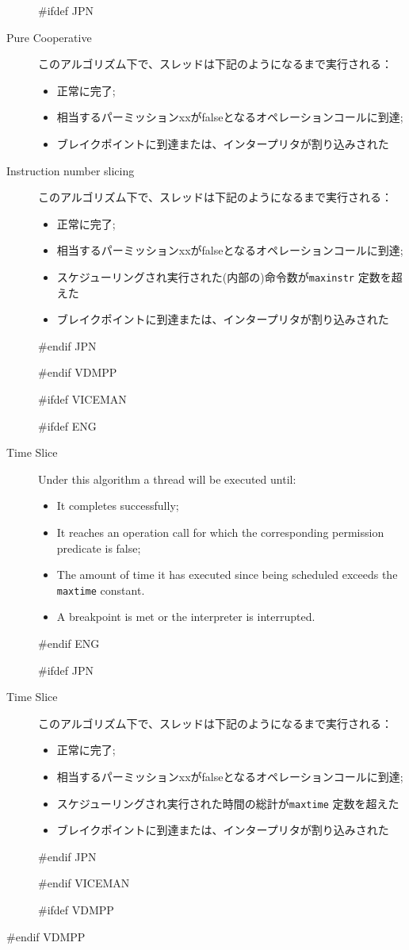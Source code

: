 \documentclass[\pformat,12pt]{article}
\begin{document}
\begin{description}
#ifdef JPN
\item[Pure Cooperative]
このアルゴリズム下で、スレッドは下記のようになるまで実行される：
\begin{itemize}
\item 正常に完了;
\item 相当するパーミッションxxがfalseとなるオペレーションコールに到達;
\item ブレイクポイントに到達または、インタープリタが割り込みされた
\end{itemize}
\item[Instruction number slicing]
このアルゴリズム下で、スレッドは下記のようになるまで実行される：
\begin{itemize}
\item 正常に完了;
\item 相当するパーミッションxxがfalseとなるオペレーションコールに到達;
\item スケジューリングされ実行された(内部の)命令数が\texttt{maxinstr} 定数を超えた
\item ブレイクポイントに到達または、インタープリタが割り込みされた
\end{itemize}
#endif JPN

#endif VDMPP

#ifdef VICEMAN

#ifdef ENG
\item[Time Slice] Under this algorithm a thread will be executed
until:
\begin{itemize}
\item It completes successfully;
\item It reaches an operation call for which the corresponding
permission predicate is false;
\item The amount of time it has executed since
being scheduled exceeds the \texttt{maxtime} constant.
\item A breakpoint is met or the interpreter is interrupted.
\end{itemize}
#endif ENG

#ifdef JPN
\item[Time Slice]
このアルゴリズム下で、スレッドは下記のようになるまで実行される：
\begin{itemize}
\item 正常に完了;
\item 相当するパーミッションxxがfalseとなるオペレーションコールに到達;
\item スケジューリングされ実行された時間の総計が\texttt{maxtime} 定数を超えた
\item ブレイクポイントに到達または、インタープリタが割り込みされた
\end{itemize}
#endif JPN

#endif VICEMAN

#ifdef VDMPP
\end{description}
#endif VDMPP
\end{document}
